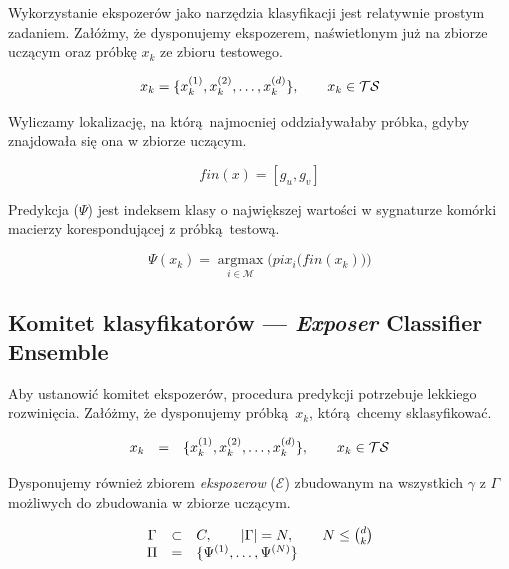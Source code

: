 \documentclass[]{article}
\begin{document}
Wykorzystanie ekspozerów jako narzędzia klasyfikacji jest relatywnie prostym zadaniem. Załóżmy, że dysponujemy ekspozerem, naświetlonym już na zbiorze uczącym oraz próbkę $x_k$ ze zbioru testowego.

\begin{equation}
	\begin{array}[b]{l}
		x_k=\{x_k^{(1)}, x_k^{(2)}, \ldots, x_k^{(d)}\},\quad\quad x_k \in \mathcal{TS}
	\end{array}
\end{equation}

Wyliczamy lokalizację, na którą najmocniej oddziaływałaby próbka, gdyby znajdowała się ona w zbiorze uczącym.

\begin{equation}
	fin(x) = [g_u,g_v]
\end{equation}

Predykcja ($\Psi$) jest indeksem klasy o największej wartości w sygnaturze komórki macierzy korespondującej z próbką testową.

\begin{equation}
	\Psi(x_k) = \mathop{argmax}\limits_{i \in \mathcal{M}}\Bigg(pix_i\Big(fin(x_k)\Big)\Bigg)
\end{equation}

\subsection{Komitet klasyfikatorów --- \emph{Exposer} Classifier Ensemble}
\label{exposerclassifierensemble}

Aby ustanowić komitet ekspozerów, procedura predykcji potrzebuje lekkiego rozwinięcia. Załóżmy, że dysponujemy próbką $x_k$, którą chcemy sklasyfikować.

\begin{equation}
	\begin{array}[b]{cll}
		x_k &=&\{x_k^{(1)}, x_k^{(2)}, \ldots, x_k^{(d)}\},\quad\quad x_k \in \mathcal{TS}
	\end{array}
\end{equation}

Dysponujemy również zbiorem \emph{ekspozerow} ($\mathcal{E}$) zbudowanym na wszystkich $\gamma$ z $\Gamma$ możliwych do zbudowania w zbiorze uczącym.

\begin{equation}
	\begin{array}[b]{cll}
		\Gamma & \subset & C,\quad\quad |\Gamma| = N,\quad\quad N \leq {d \choose k}\\
		\Pi &=& \{\Psi^{(1)},\ldots,\Psi^{(N)}\}
	\end{array}
\end{equation}
\end{document}

